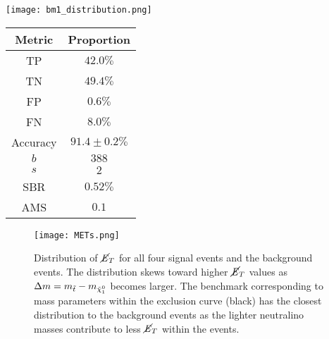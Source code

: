 \noindent\begin{minipage}{\textwidth}
\centering
  \begin{minipage}[htbp]{0.6\textwidth}
    \centering
    \texttt{[image: bm1\_distribution.png]}
    \label{fig:dist_bm1}
  \end{minipage}
  \hfill
  \begin{minipage}[htbp]{0.39\textwidth}
        \centering
        \begin{tabular}{c|c} 
        \toprule
        Metric & Proportion \\
        \midrule
        \rowcolor{gray!6} TP & $42.0 \%$ \\
        TN & $49.4 \%$ \\
        \rowcolor{gray!6} FP & $0.6 \%$\\
        FN & $8.0 \%$ \\
        \rowcolor{gray!6} Accuracy & $91.4 \pm 0.2 \%$ \\
        \midrule
        $b$ & $388$ \\
        \rowcolor{gray!6} $s$ & $2$ \\
        SBR & $0.52\%$\\
        \rowcolor{gray!6} AMS & $0.1$ \\
        \bottomrule
        \end{tabular}
        \label{tab:Values1}
    \end{minipage}
\end{minipage}
\hfill\break
\hfill\break


\begin{figure}[htbp]
    \centering
    \texttt{[image: METs.png]}
    \caption{Distribution of $\cancel{\it{E}}_{T}$ for all four signal events and the background events. The distribution skews toward higher $\cancel{\it{E}}_{T}$ values as $\Delta m = m_{\Tilde{t}} - m_{\Tilde{\chi}_1^0}$ becomes larger. The benchmark corresponding to mass parameters within the exclusion curve (black) has the closest distribution to the background events as the lighter neutralino masses contribute to less $\cancel{\it{E}}_{T}$ within the events.}
    \label{fig:METs}
\end{figure}
\hfill\break
\hfill\break


